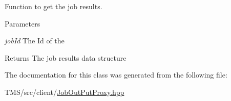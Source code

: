 Function to get the job results. 


\begin{DoxyParams}{Parameters}
\item[{\em jobId}]The Id of the \end{DoxyParams}
\begin{DoxyReturn}{Returns}
The job results data structure 
\end{DoxyReturn}


The documentation for this class was generated from the following file:\begin{DoxyCompactItemize}
\item 
TMS/src/client/\hyperlink{JobOutPutProxy_8hpp}{JobOutPutProxy.hpp}\end{DoxyCompactItemize}
